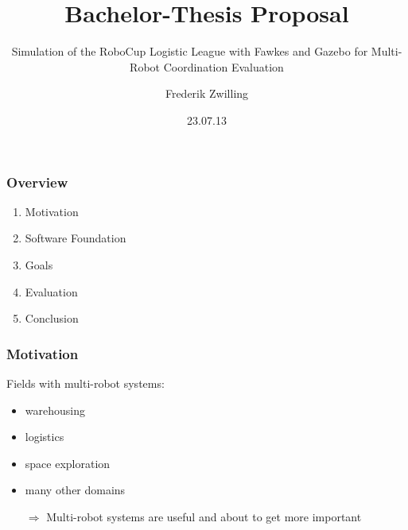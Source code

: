 \documentclass{beamer}
\title{Bachelor-Thesis Proposal}
\subtitle{Simulation of the RoboCup Logistic League with Fawkes and Gazebo for Multi-Robot Coordination Evaluation}
\author {Frederik Zwilling}
\institute{RWTH Aachen}
\date{23.07.13}
\begin{document}
\frame{\titlepage}

\begin{frame}
\frametitle{Overview}
\begin{enumerate}
\item Motivation
\item Software Foundation
\item Goals
\item Evaluation
\item Conclusion
\end{enumerate}
\end{frame}

\begin{frame}
\frametitle{Motivation}
\begin{multicols}{2}
\begin{figure}
\end{figure}
Fields with multi-robot systems:
\begin{itemize}
\item<1-> warehousing
\item<2-> logistics
\item<3-> space exploration
\item<4-> many other domains
\end{itemize}
\end{multicols}
\pause \pause \pause \pause 
\begin{itemize}
\item[$\Rightarrow$] Multi-robot systems are useful and about to get more important
\end{itemize}
\end{frame}
\end{document}
